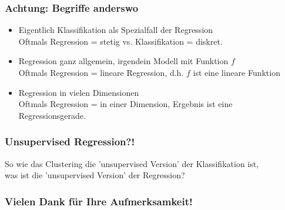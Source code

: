 \begin{frame}
  \frametitle{Achtung: Begriffe anderswo}
  \begin{itemize}[<+->]
  \item Eigentlich Klassifikation als Spezialfall der Regression\\
    Oftmals Regression = stetig vs. Klassifikation = diskret.
  \item Regression ganz allgemein, irgendein Modell mit Funktion $f$\\
    Oftmals Regression = lineare Regression, d.h. $f$ ist eine lineare Funktion
  \item Regression in vielen Dimensionen\\
    Oftmals Regression = in einer Dimension, Ergebnis ist eine \alert{Regressionsgerade}.
  \end{itemize}
\end{frame}


\begin{frame}
\frametitle{Unsupervised Regression?!}
So wie das Clustering die 'unsupervised Version' der Klassifikation ist,\\
was ist die 'unsupervised Version' der Regression?


\vspace{1cm}



\end{frame}



\begin{frame}[separator]
  \frametitle{Vielen Dank für Ihre Aufmerksamkeit!}
\end{frame}



